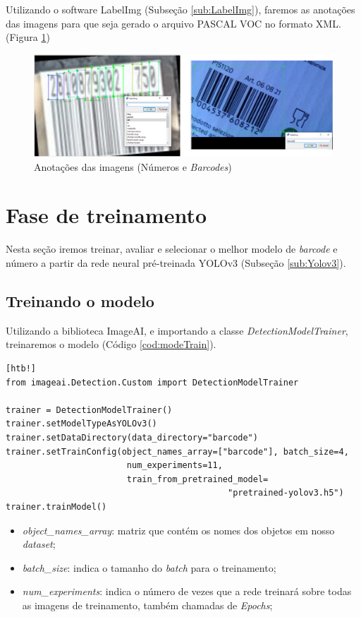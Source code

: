 Utilizando o software LabelImg (Subseção \ref{sub:LabelImg}), faremos as anotações das imagens para que seja gerado o arquivo PASCAL VOC no formato XML. (Figura \ref{fig:barNumAn})

\begin{figure}[htbp]
	\centering
	\includegraphics[width=1\linewidth]{figuras/MachineLearning/barNumAn.png}
	\caption{Anotações das imagens (Números e \textit{Barcodes})}
	\label{fig:barNumAn}
\end{figure}

\section{Fase de treinamento}

Nesta seção iremos treinar, avaliar e selecionar o melhor modelo de \textit{barcode} e número a partir da rede neural pré-treinada YOLOv3 (Subseção \ref{sub:Yolov3}).

\subsection{Treinando o modelo}

Utilizando a biblioteca ImageAI, e importando a classe \textit{DetectionModelTrainer}, treinaremos o modelo (Código \ref{cod:modeTrain}).

\begin{lstlisting}[caption=Exemplo de código do método \textit{data augmentation}, label=cod:modeTrain][htb!]
from imageai.Detection.Custom import DetectionModelTrainer

trainer = DetectionModelTrainer()
trainer.setModelTypeAsYOLOv3()
trainer.setDataDirectory(data_directory="barcode")
trainer.setTrainConfig(object_names_array=["barcode"], batch_size=4, 
                        num_experiments=11, 
                        train_from_pretrained_model=
                                            "pretrained-yolov3.h5")
trainer.trainModel()
\end{lstlisting}

\begin{itemize}
    \item \textit{object\_names\_array}: matriz que contém os nomes dos objetos em nosso \textit{dataset};
    \item \textit{batch\_size}: indica o tamanho do \textit{batch} para o treinamento;
    \item \textit{num\_experiments}: indica o número de vezes que a rede treinará sobre todas as imagens de treinamento, também chamadas de \textit{Epochs};
\end{itemize}

